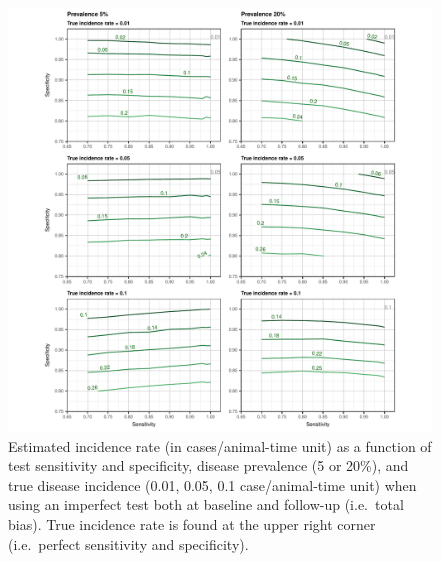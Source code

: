 \documentclass[utf8]{frontiersSCNS}\usepackage[]{graphicx}\usepackage[]{color}
\begin{document}
\begin{figure}[htbp]
  \begin{center}
    \includegraphics[scale=.95]{master-incidence_contour-1}
    \end{center}
  \caption{Estimated incidence rate (in cases/animal-time unit) as a
function of test sensitivity and specificity, disease prevalence (5 or 20\%),
and true disease incidence (0.01, 0.05, 0.1 case/animal-time unit) when using an
imperfect test both at baseline and follow-up (i.e.\ total bias). True incidence
rate is found at the upper right corner (i.e.\ perfect sensitivity and
specificity).}
  \label{fig:incidence_contour}
\end{figure}
\end{document}
